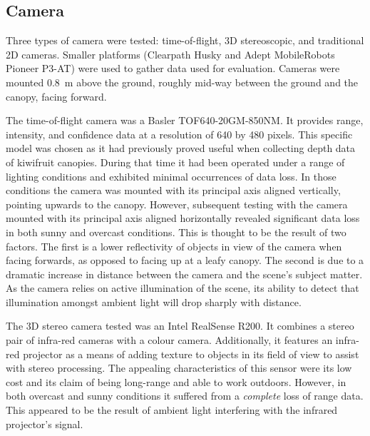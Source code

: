 \documentclass[preprint,authoryear,12pt]{elsarticle}
\begin{document}
    \subsection{Camera}
        \label{sect:camera_evaluation}

        Three types of camera were tested: time-of-flight, 3D stereoscopic, and traditional 2D cameras.
        Smaller platforms (Clearpath Husky and Adept MobileRobots Pioneer P3-AT) were used to gather data used for evaluation.
        Cameras were mounted \SI{0.8}{\meter} above the ground, roughly mid-way between the ground and the canopy, facing forward.

        The time-of-flight camera was a Basler TOF640-20GM-850NM.
        It provides range, intensity, and confidence data at a resolution of 640 by 480 pixels.
        This specific model was chosen as it had previously proved useful when collecting depth data of kiwifruit canopies.
        During that time it had been operated under a range of lighting conditions and exhibited minimal occurrences of data loss.
        In those conditions the camera was mounted with its principal axis aligned vertically, pointing upwards to the canopy.
        However, subsequent testing with the camera mounted with its principal axis aligned horizontally revealed significant data loss in both sunny and overcast conditions.
        This is thought to be the result of two factors.
        The first is a lower reflectivity of objects in view of the camera when facing forwards, as opposed to facing up at a leafy canopy.
        The second is due to a dramatic increase in distance between the camera and the scene's subject matter.
        As the camera relies on active illumination of the scene, its ability to detect that illumination amongst ambient light will drop sharply with distance.

        The 3D stereo camera tested was an Intel RealSense R200.
        It combines a stereo pair of infra-red cameras with a colour camera.
        Additionally, it features an infra-red projector as a means of adding texture to objects in its field of view to assist with stereo processing.
        The appealing characteristics of this sensor were its low cost and its claim of being long-range and able to work outdoors.
        However, in both overcast and sunny conditions it suffered from a \emph{complete} loss of range data.
        This appeared to be the result of ambient light interfering with the infrared projector’s signal.
\end{document}
